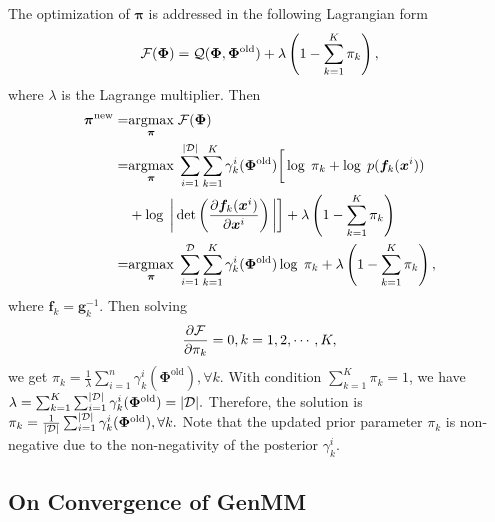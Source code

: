 The optimization of $\bm{\pi}$ is addressed in the following Lagrangian form
\begin{equation}
  \mathcal{F}(\bm{\Phi}) = \mathcal{Q}(\bm{\Phi},\bm{\Phi}^{\mathrm{old}}) + \lambda
  \left( 1 - \sum_{k=1}^{K}\pi_k \right),
\end{equation}
where $\lambda$ is the Lagrange multiplier. Then
\begin{align}
  \bm{\pi}^{\mathrm{new}} =& \underset{\bm{\pi}}{\operatorname{argmax}}\;{ \mathcal{F}(\bm{\Phi})} \nonumber\\
  =&  \underset{\bm{\pi}}{\operatorname{argmax}}\;{}\sum_{i=1}^{| \mathcal{D} |}
     \sum_{k=1}^{K}\gamma_k^{i}(\bm{\Phi}^{\mathrm{old}})\bigg[
     \log\;\pi_k +   \log\;p(\bm{f}_k(\bm{x}^{i})) \nonumber \\
                           &+ \log\;\bigg|\det\left(
                             \frac{ \partial \bm{f}_k(\bm{x}^{i})}{\partial \bm{x}^{i}}
                             \right)\bigg|\bigg] + \lambda  \left( 1 - \sum_{k=1}^{K}\pi_k \right) \nonumber\\
  =& \underset{\bm{\pi}}{\operatorname{argmax}}\;{} \sum_{i=1}^{\mathcal{D}}
     \sum_{k=1}^{K}\gamma_k^{i}(\bm{\Phi}^{\mathrm{old}})
     \log\;\pi_k+ \lambda  \left( 1 - \sum_{k=1}^{K}\pi_k \right),
\end{align}
where $\bm{f}_k = \bm{g}_k^{-1}$. Then solving
\begin{equation}
  \frac{ \partial \mathcal{F}}{\partial \pi_k} = 0, k=1, 2, \cdots, K,
\end{equation}
we get 
$
\pi_k = \frac{1}{\lambda}
\sum_{i=1}^{n}\gamma_k^{i}(\bm{\Phi}^{\mathrm{old}}), \forall k.
$
With condition $\sum_{k=1}^{K}\pi_k =1$, we have
$
\lambda = \sum_{k=1}^{K}\sum_{i=1}^{| \mathcal{D} |}\gamma_k^{i}(\bm{\Phi}^{\mathrm{old}}) =| \mathcal{D} |.
$
Therefore, the solution is
$
\pi_k = \frac{1}{| \mathcal{D} |}
\sum_{i=1}^{| \mathcal{D} |}\gamma_k^{i}(\bm{\Phi}^{\mathrm{old}}), \forall k.
$
Note that the updated prior parameter $\pi_k$
is non-negative due to the non-negativity of the posterior $\gamma_k^{i}$.

\subsection{On Convergence of GenMM}






